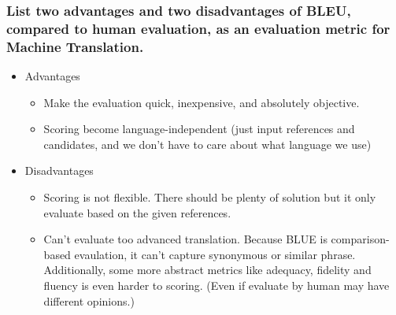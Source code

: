 \documentclass[12pt, letterpaper]{article}
\begin{document}
\subsubsection{List two advantages and two disadvantages of BLEU, compared to human evaluation, as an evaluation metric for Machine Translation.}

\begin{itemize}[topsep=0pt, partopsep=0pt]
  \item Advantages {
    \begin{itemize}
      \item Make the evaluation quick, inexpensive, and absolutely objective.
      \item Scoring become language-independent (just input references and candidates, and we don't have to care about what language we use)
    \end{itemize}
  }
  \item Disadvantages {
    \begin{itemize}
      \item Scoring is not flexible. There should be plenty of solution but it only evaluate based on the given references.
      \item Can't evaluate too advanced translation. Because BLUE is comparison-based evaulation, it can't capture synonymous or similar phrase. Additionally, some more abstract metrics like adequacy, fidelity and fluency is even harder to scoring. (Even if evaluate by human may have different opinions.)
    \end{itemize}
  }
\end{itemize}
\end{document}
